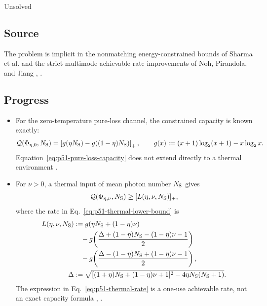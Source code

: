 Unsolved

\subsection*{Source}

The problem is implicit in the nonmatching energy-constrained bounds of
Sharma et al. and the strict multimode achievable-rate improvements of Noh,
Pirandola, and Jiang ,
.

\subsection*{Progress}

\begin{itemize}
  \item For the zero-temperature pure-loss channel, the constrained capacity
  is known exactly:
  \begin{equation}
    \mathcal Q(\Phi_{\eta,0},N_{\rm S})
    =\left[g(\eta N_{\rm S})-g((1-\eta)N_{\rm S})\right]_+,
    \qquad
    g(x):=(x+1)\log_2(x+1)-x\log_2x.
    \label{eq:p51-pure-loss-capacity}
  \end{equation}
  Equation~\eqref{eq:p51-pure-loss-capacity} does not extend directly to a
  thermal environment .

  \item For $\nu>0$, a thermal input of mean photon number $N_{\rm S}$ gives
  \begin{equation}
    \mathcal Q(\Phi_{\eta,\nu},N_{\rm S})
    \geq[L(\eta,\nu,N_{\rm S})]_+,
    \label{eq:p51-thermal-lower-bound}
  \end{equation}
  where the rate in Eq.~\eqref{eq:p51-thermal-lower-bound} is
  \begin{equation}
    \begin{aligned}
    L(\eta,\nu,N_{\rm S})
      &:={}
      g(\eta N_{\rm S}+(1-\eta)\nu)\\
      &\quad-g\!\left(
        \frac{\Delta+(1-\eta)N_{\rm S}-(1-\eta)\nu-1}{2}
      \right)\\
      &\quad-g\!\left(
        \frac{\Delta-(1-\eta)N_{\rm S}+(1-\eta)\nu-1}{2}
      \right),\\
    \Delta
      &:=\sqrt{[(1+\eta)N_{\rm S}+(1-\eta)\nu+1]^2
                -4\eta N_{\rm S}(N_{\rm S}+1)}.
    \end{aligned}
    \label{eq:p51-thermal-rate}
  \end{equation}
  The expression in Eq.~\eqref{eq:p51-thermal-rate} is a one-use achievable
  rate, not an exact capacity formula
  ,
  .


\end{itemize}
